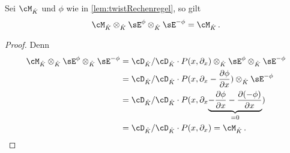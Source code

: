 \begin{cor} \label{cor:zuruecktwisten}
Sei $\cM_{\hat K}$ und $\phi$ wie in \ref{lem:twistRechenregel}, so gilt
\[
\cM_{\hat K}\otimes_{\hat K}\sE^{\phi}\otimes_{\hat K}\sE^{-\phi}=\cM_{\hat K}\,.
\]
\end{cor}
\begin{proof}
Denn
\begin{align*}
\cM_{\hat K}\otimes_{\hat K}\sE^{\phi}\otimes_{\hat K}\sE^{-\phi}
  &= \cD_{\hat K}/\cD_{\hat K}\cdot P(x,\partial_x)
    \otimes_{\hat K}\sE^{\phi}\otimes_{\hat K}\sE^{-\phi}
\\&= \cD_{\hat K}/\cD_{\hat K}
  \cdot P(x,\partial_x-\frac{\partial \phi}{\partial x})
  \otimes_{\hat K}\sE^{-\phi}
\\&= \cD_{\hat K}/\cD_{\hat K} \cdot P(x,\partial_x\underset{=0}{\underbrace{
  -\frac{\partial \phi}{\partial x} -\frac{\partial (-\phi)}{\partial x}}})
\\&= \cD_{\hat K}/\cD_{\hat K} \cdot P(x,\partial_x) = \cM_{\hat K} \,.
\end{align*}
\end{proof}

